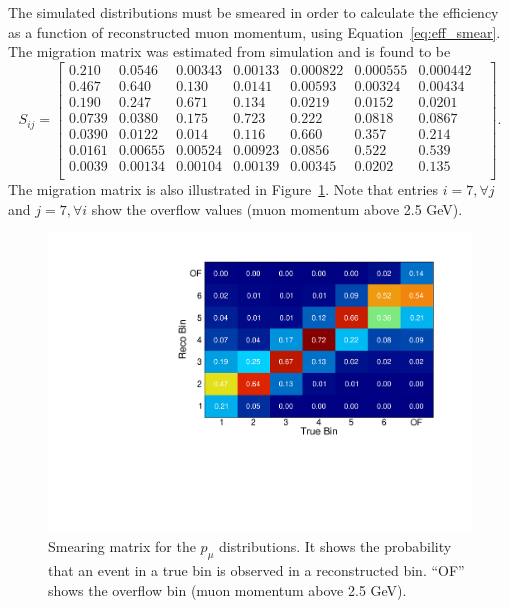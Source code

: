 The simulated distributions must be smeared in order to calculate the efficiency as a function of reconstructed muon momentum, using Equation~\eqref{eq:eff_smear}. The migration matrix was estimated from simulation and is found to be
\begin{equation}
S_{ij} =
\begin{bmatrix}
0.210  &  0.0546  &  0.00343  &  0.00133  &  0.000822  &  0.000555  &  0.000442  &   \\
0.467  &  0.640  &  0.130  &  0.0141  &  0.00593  &  0.00324  &  0.00434  &   \\
0.190  &  0.247  &  0.671  &  0.134  &  0.0219  &  0.0152  &  0.0201  &   \\
0.0739  &  0.0380  &  0.175  &  0.723  &  0.222  &  0.0818  &  0.0867  &   \\
0.0390  &  0.0122  &  0.014  &  0.116  &  0.660  &  0.357  &  0.214  &   \\
0.0161  &  0.00655  &  0.00524  &  0.00923  &  0.0856  &  0.522  &  0.539  &   \\
0.0039  &  0.00134  &  0.00104  &  0.00139  &  0.00345  &  0.0202  &  0.135  &   \\
\end{bmatrix}.
\end{equation}
The migration matrix is also illustrated in Figure~\ref{fig:trkmom_migration_matrix_2d}. Note that entries $i = 7, \forall j$ and $j = 7, \forall i$ show the overflow values (muon momentum above 2.5 GeV).

\begin{figure}[]
\centering
\includegraphics[width=.80\textwidth]{images/XSecPmu/migration_matrix_2d}
\caption[Smearing Matrix for the $p_\mu$ Distributions]{Smearing matrix for the $p_\mu$ distributions. It shows the probability that an event in a true bin is observed in a reconstructed bin. ``OF'' shows the overflow bin (muon momentum above 2.5 GeV).}
\label{fig:trkmom_migration_matrix_2d}
\end{figure}




